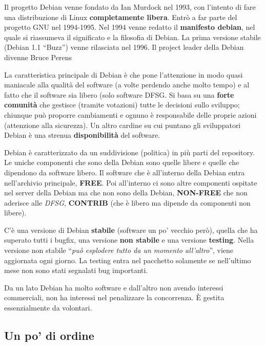 Il progetto Debian venne fondato da Ian Murdock nel 1993, con l'intento di fare una distribuzione di Linux \textbf{completamente libera}. Entrò a far parte del progetto GNU nel 1994-1995. Nel 1994 venne redatto il \textbf{manifesto debian}, nel quale si riassumeva il significato e la filosofia di Debian. La prima versione stabile (Debian 1.1 ``Buzz'') venne rilasciata nel 1996. Il project leader della Debian divenne Bruce Perens

La caratteristica principale di Debian è che pone l'attenzione in modo quasi maniacale alla qualità del software (a volte perdendo anche molto tempo) e al fatto che il software sia libero (solo software DFSG. Si basa su una \textbf{forte comunità} che gestisce (tramite votazioni) tutte le decisioni sullo sviluppo; chiunque può proporre cambiamenti e ognuno è responsabile delle proprie azioni (attenzione alla sicurezza). Un altro cardine su cui puntano gli sviluppatori Debian è una strenua \textbf{disponibilità} del software.

Debian è caratterizzato da un suddivisione (politica) in più parti del repository. Le uniche componenti che sono della Debian sono quelle libere e quelle che dipendono da software libero. Il software che è all'interno della Debian entra nell'archivio principale, \textbf{FREE}. Poi all'interno ci sono altre componenti ospitate nel server della Debian ma che non sono della Debian, \textbf{NON-FREE} che non aderisce alle \textit{DFSG}, \textbf{CONTRIB} (che è libero ma dipende da componenti non libere).

C'è una versione di Debian \textbf{stabile} (software un po' vecchio però), quella che ha superato tutti i bugfix, una versione \textbf{non stabile} e una versione \textbf{testing}. Nella versione non stabile ``\textit{può esplodere tutto da un momento all'altro}'', viene aggiornata ogni giorno. La testing entra nel pacchetto solamente se nell'ultimo mese non sono stati segnalati bug importanti.

Da un lato Debian ha molto software e dall'altro non avendo interessi commerciali, non ha interessi nel penalizzare la concorrenza. È gestita essenzialmente da volontari.

\subsection{Un po' di ordine}

